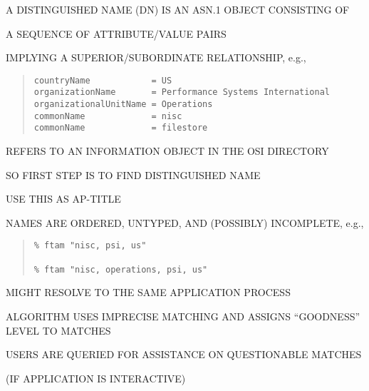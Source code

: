 \begin{bwslide}

\begin{nrtc}
\item	A DISTINGUISHED NAME (DN) IS AN ASN.1 OBJECT CONSISTING OF
    \begin{nrtc}
    \item	A SEQUENCE OF ATTRIBUTE/VALUE PAIRS
    \end{nrtc}
    IMPLYING A SUPERIOR/SUBORDINATE RELATIONSHIP, e.g.,
\begin{quote}\small\begin{verbatim}
countryName            = US
organizationName       = Performance Systems International
organizationalUnitName = Operations
commonName             = nisc
commonName             = filestore
\end{verbatim}\end{quote}
REFERS TO AN INFORMATION OBJECT IN THE OSI DIRECTORY

\item	SO FIRST STEP IS TO FIND DISTINGUISHED NAME
    \begin{nrtc}
    \item	USE THIS AS AP-TITLE
    \end{nrtc}
\end{nrtc}
\end{bwslide}


\begin{bwslide}

\begin{nrtc}
\item	NAMES ARE ORDERED, UNTYPED, AND (POSSIBLY) INCOMPLETE, e.g.,
\begin{quote}\small\begin{verbatim}
% ftam "nisc, psi, us"

% ftam "nisc, operations, psi, us"
\end{verbatim}\end{quote}
	MIGHT RESOLVE TO THE SAME APPLICATION PROCESS

\item	ALGORITHM USES IMPRECISE MATCHING AND ASSIGNS ``GOODNESS'' LEVEL TO
	MATCHES

\item	USERS ARE QUERIED FOR ASSISTANCE ON QUESTIONABLE MATCHES
    \begin{nrtc}
    \item	(IF APPLICATION IS INTERACTIVE)
    \end{nrtc}
\end{nrtc}
\end{bwslide}


